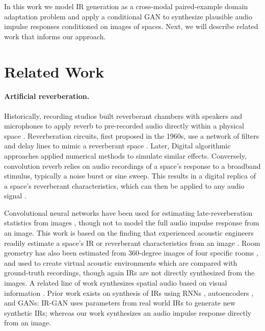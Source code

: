 \documentclass[10pt,twocolumn,letterpaper]{article}
\begin{document}
In this work we model IR generation as a cross-modal paired-example domain adaptation problem and apply a conditional GAN \cite{goodfellow2014generative, gui2020review, mirza2014conditional} to synthesize plausible audio impulse responses conditioned on images of spaces. Next, we will describe related work that informs our approach.

\section{Related Work}
\label{previouswork}

\paragraph{Artificial reverberation.}
Historically, recording studios built reverberant chambers with speakers and microphones to apply reverb to pre-recorded audio directly within a physical space \cite{rettinger1957reverberation}. Reverberation circuits, first proposed in the 1960s, use a network of filters and delay lines to mimic a reverberant space \cite{Schroeder1961}. Later, Digital algorithmic approaches applied numerical methods to simulate similar effects. Conversely, convolution reverb relies on audio recordings of a space's response to a broadband stimulus, typically a noise burst or sine sweep. This results in a digital replica of a space's reverberant characteristics, which can then be applied to any audio signal \cite{anderegg2004convolution}.

Convolutional neural networks have been used for estimating late-reverberation statistics from images \cite{Kon2019, Kon2020}, though not to model the full audio impulse response from an image. This work is based on the finding that experienced acoustic engineers readily estimate a space's IR or reverberant characteristics from an image \cite{Kon2018}. Room geometry has also been estimated from 360-degree images of four specific rooms \cite{remaggi2019reproducing}, and used to create virtual acoustic environments which are compared with ground-truth recordings, though again IRs are not directly synthesized from the images. A related line of work synthesizes spatial audio based on visual information \cite{li2018, gao2019visual-sound, kim2019}. Prior work exists on synthesis of IRs using RNNs \cite{sali2020}, autoencoders \cite{steinmetz2018}, and GANs: IR-GAN \cite{ratnarajah2021} uses parameters from real world IRs to generate new synthetic IRs; whereas our work synthesizes an audio impulse response directly from an image.
\end{document}
